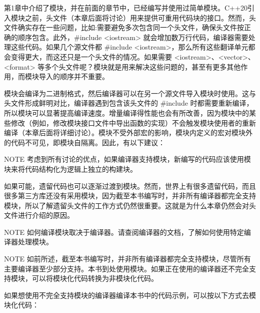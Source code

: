 
第1章中介绍了模块，并在前面的章节中，已经编写并使用过简单模块。C++20引入模块之前，头文件（本章后面将讨论）用来提供可重用代码块的接口。然而，头文件确实存在一些问题，比如:需要避免多次包含同一个头文件，确保头文件按正确的顺序包含。此外，\#include <iostream> 就会增加数万行代码，编译器需要处理这些代码。如果几个源文件都 \#include <iostream>，那么所有这些翻译单元都会变得更大，而这还只是一个头文件的情况。如果需要 <iostream>、<vector>、<format> 等多个头文件呢？模块就是用来解决这些问题的，甚至有更多其他作用，而模块导入的顺序并不重要。

模块会编译为二进制格式，然后编译器可以在另一个源文件导入模块时使用。这与头文件形成鲜明对比，编译器遇到包含该头文件的 \#include 时都需要重新编译，所以模块可以显著提高编译速度。增量编译得性能也会有所改善，因为模块中的某些修改（例如，修改模块接口文件中导出函数的实现）不会触发模块使用者的重新编译（本章后面将详细讨论）。模块不受外部宏的影响，模块内定义的宏对模块外的代码不可见，即模块自隔离。因此，有以下建议：

\begin{myNotic}{NOTE}
考虑到所有讨论的优点，如果编译器支持模块，新编写的代码应该使用模块来将代码结构化为逻辑上独立的构建块。
\end{myNotic}

如果可能，遗留代码也可以逐渐过渡到模块。然而，世界上有很多遗留代码，而且很多第三方库还没有采用模块，因为截至本书编写时，并非所有编译器都完全支持模块，所以了解遗留头文件的工作方式仍然很重要。这就是为什么本章仍然会对头文件进行介绍的原因。

\begin{myNotic}{NOTE}
如何编译模块取决于编译器。请查阅编译器的文档，了解如何使用特定编译器处理模块。
\end{myNotic}

\begin{myNotic}{NOTE}
如前所述，截至本书编写时，并非所有编译器都完全支持模块，尽管所有主要编译器至少部分支持。本书到处使用模块。如果正在使用的编译器还不完全支持模块，可以将模块化代码转换为非模块化代码。
\end{myNotic}


如果想使用不完全支持模块的编译器编译本书中的代码示例，可以按以下方式去模块化代码：

